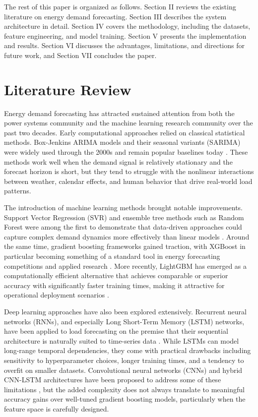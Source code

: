 \documentclass[conference]{IEEEtran}
\begin{document}
The rest of this paper is organized as follows. Section II reviews the existing literature on energy demand forecasting. Section III describes the system architecture in detail. Section IV covers the methodology, including the datasets, feature engineering, and model training. Section V presents the implementation and results. Section VI discusses the advantages, limitations, and directions for future work, and Section VII concludes the paper.

\section{Literature Review}

Energy demand forecasting has attracted sustained attention from both the power systems community and the machine learning research community over the past two decades. Early computational approaches relied on classical statistical methods. Box-Jenkins ARIMA models and their seasonal variants (SARIMA) were widely used through the 2000s and remain popular baselines today \cite{b1}. These methods work well when the demand signal is relatively stationary and the forecast horizon is short, but they tend to struggle with the nonlinear interactions between weather, calendar effects, and human behavior that drive real-world load patterns. \par

The introduction of machine learning methods brought notable improvements. Support Vector Regression (SVR) and ensemble tree methods such as Random Forest were among the first to demonstrate that data-driven approaches could capture complex demand dynamics more effectively than linear models \cite{b2}. Around the same time, gradient boosting frameworks gained traction, with XGBoost in particular becoming something of a standard tool in energy forecasting competitions and applied research \cite{b3}. More recently, LightGBM has emerged as a computationally efficient alternative that achieves comparable or superior accuracy with significantly faster training times, making it attractive for operational deployment scenarios \cite{b4}. \par

Deep learning approaches have also been explored extensively. Recurrent neural networks (RNNs), and especially Long Short-Term Memory (LSTM) networks, have been applied to load forecasting on the premise that their sequential architecture is naturally suited to time-series data \cite{b5}. While LSTMs can model long-range temporal dependencies, they come with practical drawbacks including sensitivity to hyperparameter choices, longer training times, and a tendency to overfit on smaller datasets. Convolutional neural networks (CNNs) and hybrid CNN-LSTM architectures have been proposed to address some of these limitations \cite{b6}, but the added complexity does not always translate to meaningful accuracy gains over well-tuned gradient boosting models, particularly when the feature space is carefully designed. \par
\end{document}
